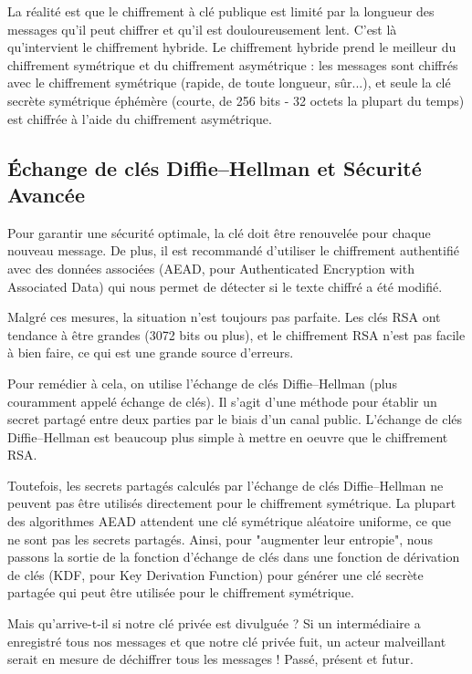 La réalité est que le chiffrement à clé publique est limité par la longueur des messages qu'il peut chiffrer et qu'il est douloureusement lent. C'est là qu'intervient le chiffrement hybride. Le chiffrement hybride prend le meilleur du chiffrement symétrique et du chiffrement asymétrique : les messages sont chiffrés avec le chiffrement symétrique (rapide, de toute longueur, sûr...), et seule la clé secrète symétrique éphémère (courte, de 256 bits - 32 octets la plupart du temps) est chiffrée à l'aide du chiffrement asymétrique.

\subsection{Échange de clés Diffie–Hellman et Sécurité Avancée}

Pour garantir une sécurité optimale, la clé doit être renouvelée pour chaque nouveau message. De plus, il est recommandé d'utiliser le chiffrement authentifié avec des données associées (AEAD, pour Authenticated Encryption with Associated Data) qui nous permet de détecter si le texte chiffré a été modifié.

Malgré ces mesures, la situation n'est toujours pas parfaite. Les clés RSA ont tendance à être grandes (3072 bits ou plus), et le chiffrement RSA n'est pas facile à bien faire, ce qui est une grande source d'erreurs.

Pour remédier à cela, on utilise l'échange de clés Diffie–Hellman (plus couramment appelé échange de clés). Il s'agit d'une méthode pour établir un secret partagé entre deux parties par le biais d'un canal public. L'échange de clés Diffie–Hellman est beaucoup plus simple à mettre en oeuvre que le chiffrement RSA.

Toutefois, les secrets partagés calculés par l'échange de clés Diffie–Hellman ne peuvent pas être utilisés directement pour le chiffrement symétrique. La plupart des algorithmes AEAD attendent une clé symétrique aléatoire uniforme, ce que ne sont pas les secrets partagés. Ainsi, pour "augmenter leur entropie", nous passons la sortie de la fonction d'échange de clés dans une fonction de dérivation de clés (KDF, pour Key Derivation Function) pour générer une clé secrète partagée qui peut être utilisée pour le chiffrement symétrique.

Mais qu'arrive-t-il si notre clé privée est divulguée ? Si un intermédiaire a enregistré tous nos messages et que notre clé privée fuit, un acteur malveillant serait en mesure de déchiffrer tous les messages ! Passé, présent et futur.

